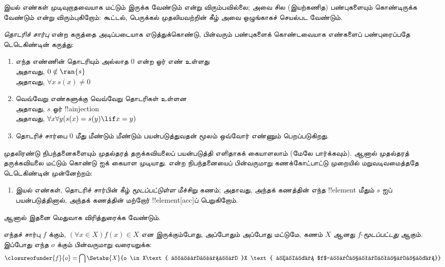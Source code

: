 \documentclass[../../../include/open-logic-section]{subfiles}
\begin{document}

இயல் எண்கள் முடிவுறாதவையாக மட்டும் இருக்க வேண்டும் என்று விரும்பவில்லை;
அவை சில (இயற்கணித) பண்புகளையும் கொண்டிருக்க வேண்டும் என்று விரும்புகிறோம்:
கூட்டல், பெருக்கல் முதலியவற்றின் கீழ் அவை ஒழுங்காகச் செயல்பட வேண்டும்.

\emph{தொடரிச் சார்பு} என்ற கருத்தை அடிப்படையாக எடுத்துக்கொண்டு,
பின்வரும் பண்புகளைக் கொண்டவையாக எண்களைப் பண்புரைப்பதே
டெடெகிண்டின் கருத்து:
\begin{enumerate}
	\item எந்த எண்ணின் தொடரியும் அல்லாத $0$ என்ற ஓர் எண் உள்ளது
	\\ அதாவது, $0 \notin \ran{s}$
	\\ அதாவது, $\forall x\ s(x) \neq 0$
	\item வெவ்வேறு எண்களுக்கு வெவ்வேறு தொடரிகள் உள்ளன
	\\ அதாவது, $s$ ஓர் !!a{injection}
	\\ அதாவது, $\forall x \forall y (s(x) = s(y) \lif x = y)$
	\item{} தொடரிச் சார்பை $0$ மீது
    மீண்டும் மீண்டும் பயன்படுத்துவதன் மூலம் ஒவ்வோர் எண்ணும் பெறப்படுகிறது.
\end{enumerate}
முதலிரண்டு நிபந்தனைகளையும் முதல்தரத் தருக்கவியலைப் பயன்படுத்தி
எளிதாகக் கையாளலாம் (மேலே பார்க்கவும்).
ஆனால் முதல்தரத் தருக்கவியலை மட்டும் கொண்டு
 ஐக் கையாள முடியாது.
 என்ற நிபந்தனையைப் பின்வருமாறு
கணக்கோட்பாட்டு முறையில் மறுவடிவமைத்ததே டெடெகிண்டின் முன்னேற்றம்:
\begin{enumerate}
	\item[3$'$.] இயல் எண்கள், தொடரிச் சார்பின் கீழ்
	\emph{மூடப்பட்டுள்ள} மீச்சிறு கணம்;
    அதாவது, அந்தக் கணத்தின் எந்த !!{element} மீதும் $s$ ஐப்
    பயன்படுத்தினால், அந்தக் கணத்தின் மற்றோர் !!{element}[acc]ப் பெறுகிறோம்.
\end{enumerate}
ஆனால் இதனை மெதுவாக விரித்துரைக்க வேண்டும்.

\begin{defn}
	எந்தச் சார்பு $f$ க்கும், $(\forall x \in X)f(x) \in X$ என
    இருக்கும்போது, அப்போதும் அப்போது மட்டுமே, கணம் $X$ ஆனது
    $f$-\emph{மூடப்பட்டது} ஆகும்.
    இப்போது எந்த $o$ க்கும் பின்வருமாறு வரையறுக்க:
	$$\closureofunder{f}{o} = \bigcap\Setabs{X}{o \in X\text{ மற்றும் }X
\text{ ஆனது $f$-மூடப்பட்டது}}$$
\end{defn}
\end{document}
